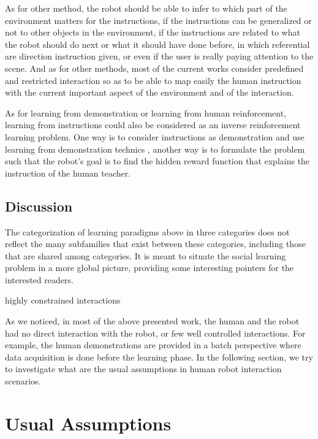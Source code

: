 As for other method, the robot should be able to infer to which part of the environment matters for the instructions, if the instructions can be generalized or not to other objects in the environment, if the instructions are related to what the robot should do next or what it should have done before, in which referential are direction instruction given, or even if the user is really paying attention to the scene. And as for other methods, most of the current works consider predefined and restricted interaction so as to be able to map easily the human instruction with the current important aspect of the environment and of the interaction.

As for learning from demonstration or learning from human reinforcement, learning from instructions could also be considered as an inverse reinforcement learning problem. One way is to consider instructions as demonstration and use learning from demonstration technics , another way is to formulate the problem such that the robot's goal is to find the hidden reward function that explains the instruction of the human teacher.

\subsection{Discussion}

The categorization of learning paradigms above in three categories does not reflect the many subfamilies that exist between these categories, including those that are shared among categories. It is meant to situate the social learning problem in a more global picture, providing some interesting pointers for the interested readers. 

highly constrained interactions

As we noticed, in most of the above presented work, the human and the robot had no direct interaction with the robot, or few well controlled interactions. For example, the human demonstrations are provided in a batch perspective where data acquisition is done
before the learning phase. In the following section, we try to investigate what are the usual assumptions in human robot interaction scenarios.



\section{Usual Assumptions}


